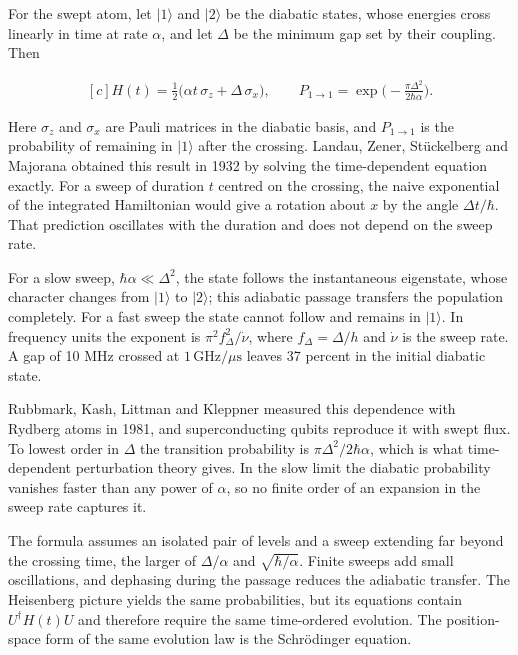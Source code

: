 \documentclass[11pt,oneside]{book}
\newenvironment{centeredalign}{\[\begin{gathered}[c]}{\end{gathered}\]}
\begin{document}
For the swept atom, let \(|1\rangle\) and \(|2\rangle\) be the diabatic states, whose energies cross linearly in time at rate \(\alpha\), and let \(\Delta\) be the minimum gap set by their coupling. Then

\begin{centeredalign}
H(t)=\frac12\big(\alpha t\,\sigma_z+\Delta\,\sigma_x\big),\qquad
P_{1\to1}=\exp\Big(-\frac{\pi\Delta^2}{2\hbar\alpha}\Big).
\end{centeredalign}

Here \(\sigma_z\) and \(\sigma_x\) are Pauli matrices in the diabatic basis, and \(P_{1\to1}\) is the probability of remaining in \(|1\rangle\) after the crossing. Landau, Zener, Stückelberg and Majorana obtained this result in 1932 by solving the time-dependent equation exactly. For a sweep of duration \(t\) centred on the crossing, the naive exponential of the integrated Hamiltonian would give a rotation about \(x\) by the angle \(\Delta t/\hbar\). That prediction oscillates with the duration and does not depend on the sweep rate.

For a slow sweep, \(\hbar\alpha\ll\Delta^2\), the state follows the instantaneous eigenstate, whose character changes from \(|1\rangle\) to \(|2\rangle\); this adiabatic passage transfers the population completely. For a fast sweep the state cannot follow and remains in \(|1\rangle\). In frequency units the exponent is \(\pi^2f_\Delta^2/\dot\nu\), where \(f_\Delta=\Delta/h\) and \(\dot\nu\) is the sweep rate. A gap of 10 MHz crossed at \(1\,\mathrm{GHz}/\mu\mathrm s\) leaves 37 percent in the initial diabatic state.

Rubbmark, Kash, Littman and Kleppner measured this dependence with Rydberg atoms in 1981, and superconducting qubits reproduce it with swept flux. To lowest order in \(\Delta\) the transition probability is \(\pi\Delta^2/2\hbar\alpha\), which is what time-dependent perturbation theory gives. In the slow limit the diabatic probability vanishes faster than any power of \(\alpha\), so no finite order of an expansion in the sweep rate captures it.

The formula assumes an isolated pair of levels and a sweep extending far beyond the crossing time, the larger of \(\Delta/\alpha\) and \(\sqrt{\hbar/\alpha}\). Finite sweeps add small oscillations, and dephasing during the passage reduces the adiabatic transfer. The Heisenberg picture yields the same probabilities, but its equations contain \(U^\dagger H(t)U\) and therefore require the same time-ordered evolution. The position-space form of the same evolution law is the Schrödinger equation.
\end{document}

